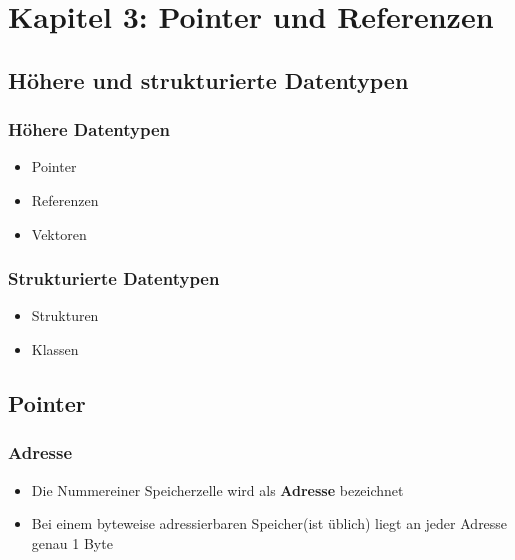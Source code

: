 
\section{Kapitel 3: Pointer und Referenzen}
\label{sec:Kapitel 3: Pointer und Referenzen}

\subsection{Höhere und strukturierte Datentypen}
\label{sec:Hoehere und strukturierte Datentypen}

\subsubsection{Höhere Datentypen}
\label{sec:Hoehere Datentypen}
\begin{itemize}
	\item Pointer
	\item Referenzen
	\item Vektoren
\end{itemize}

\subsubsection{Strukturierte Datentypen}
\label{sec:Strukturierte Datentypen}
\begin{itemize}
	\item Strukturen
	\item Klassen
\end{itemize}


\subsection{Pointer}
\label{sec:Pointer}

\subsubsection{Adresse}
\label{sec:Adresse}
\begin{itemize}
	\item Die Nummereiner Speicherzelle wird als \textbf{Adresse} bezeichnet
	\item Bei einem byteweise adressierbaren Speicher(ist üblich) liegt an jeder Adresse genau 1 Byte
\end{itemize}


